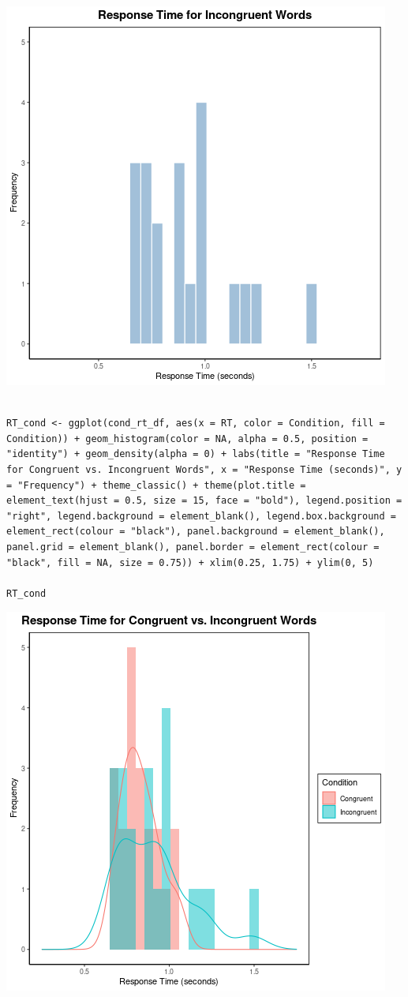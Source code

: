 \documentclass{article}
\begin{document}
\begin{center}
\includegraphics[width=.9\linewidth]{converted_stroop6.png}
\end{center}



\begin{verbatim}

RT_cond <- ggplot(cond_rt_df, aes(x = RT, color = Condition, fill = Condition)) + geom_histogram(color = NA, alpha = 0.5, position = "identity") + geom_density(alpha = 0) + labs(title = "Response Time for Congruent vs. Incongruent Words", x = "Response Time (seconds)", y = "Frequency") + theme_classic() + theme(plot.title = element_text(hjust = 0.5, size = 15, face = "bold"), legend.position = "right", legend.background = element_blank(), legend.box.background = element_rect(colour = "black"), panel.background = element_blank(), panel.grid = element_blank(), panel.border = element_rect(colour = "black", fill = NA, size = 0.75)) + xlim(0.25, 1.75) + ylim(0, 5)

RT_cond

\end{verbatim}

\begin{center}
\includegraphics[width=.9\linewidth]{converted_stroop7.png}
\end{center}
\end{document}
